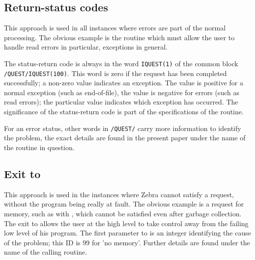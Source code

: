 \subsection{Return-status codes}
\par This approach is used in all instances where errors are part of
the normal processing.
The obvious example is the routine  which must allow the
user to handle read errors in particular, exceptions in general.
\par The status-return code is always in the word {\tt IQUEST(1)} of
the common block {\tt/QUEST/IQUEST(100)}.
This word is zero if the request has been completed successfully;
a non-zero value indicates an exception.
The value is positive for a normal exception (such as end-of-file),
the value is negative for errors (such as read errors);
the particular value indicates which exception has occurred.
The significance of the status-return code is part of the
specifications of the routine.
\par For an error status, other words in {\tt/QUEST/} carry more
information to identify the problem,
the exact details are found in the present paper
under the name of the routine in question.
\subsection{Exit to }
\par This approach is used in the instances where Zebra cannot
satisfy a request, without the program being really at fault.
The obvious example is a request for memory, such as with ,
which cannot be satisfied even after garbage collection.
The exit to  allows the user at the high level to take
control away from the failing low level of his program.
The first parameter to  is an integer identifying the
cause of the problem; this ID is 99 for 'no memory'.
Further details are found
under the name of the calling routine. 

